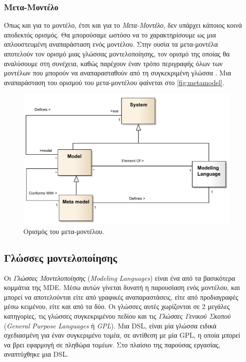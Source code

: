 \subsubsection{Μετα-Μοντέλο}
\label{subsubsec:metamodel}

Όπως και για το μοντέλο, έτσι και για το \textit{Μετα-Μοντέλο}, δεν υπάρχει κάποιος κοινά αποδεκτός ορισμός. Θα μπορούσαμε ωστόσο να το χαρακτηρίσουμε ως μια απλουστευμένη αναπαράσταση ενός μοντέλου. Στην ουσία τα μετα-μοντέλα αποτελούν τον ορισμό μιας γλώσσας μοντελοποίησης, τον ορισμό της οποίας θα αναλύσουμε στη συνέχεια, καθώς παρέχουν έναν τρόπο περιγραφής όλων των μοντέλων που μπορούν να αναπαρασταθούν από τη συγκεκριμένη γλώσσα \cite{bib:brambilla_2012}. Μια αναπαράσταση του ορισμού του μετα-μοντέλου φαίνεται στο \autoref{fig:metamodel}.

\begin{figure}[!ht]
	\centering
	\includegraphics[width=1\textwidth]{./images/chapter3/metamodel.png}
	\caption{Ορισμός του μετα-μοντέλου.}
	\label{fig:metamodel}
\end{figure}

\subsection{Γλώσσες μοντελοποίησης}
\label{subsec:dsls}

Οι \textit{Γλώσσες Μοντελοποίησης} (\textit{Modeling Languages}) είναι ένα από τα βασικότερα κομμάτια της MDE. Μέσω αυτών γίνεται δυνατή η παρουσίαση ενός μοντέλου, και μπορεί να αποτελούνται είτε από γραφικές αναπαραστάσεις, είτε από προδιαγραφές μέσω κειμένου, είτε και από τα δύο. Οι γλώσσες αυτές χωρίζονται σε 2 μεγάλες κατηγορίες, τις γλώσσες συγκεκριμένου πεδίου και τις \textit{Γλώσσες Γενικού Σκοπού} (\textit{General Purpose Languages} ή \textit{GPL}). Μια DSL, είναι μία γλώσσα ειδικά σχεδιασμένη για έναν συγκεριμένο τομέα, σε αντίθεση με μία GPL, η οποία μπορεί να βρει εφαρμογή σε πληθώρα τομέων. Στο πλαίσιο της παρούσας εργασίας, αναπτύχθηκε μια DSL.

